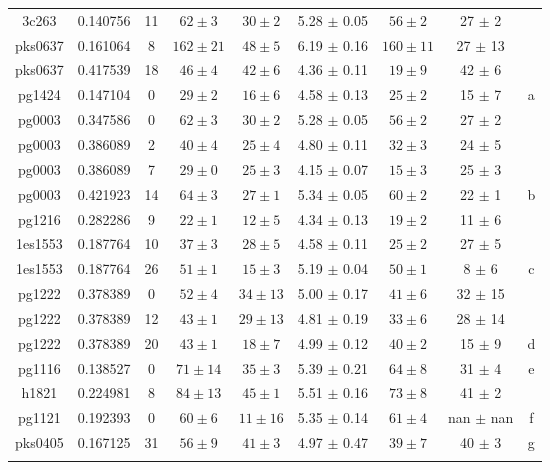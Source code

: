 \documentclass[12pt]{report}
\begin{document}
\begin{table}[!h]
\begin{tabular}{c@{\hspace{1.5em}}c@{\hspace{1.5em}}c@{\hspace{1.5em}}c@{\hspace{1.5em}}c@{\hspace{1.5em}}c@{\hspace{1em}}c@{\hspace{1em}}cc}
    3c263 & 0.140756 & 11  & $62 \pm 3$ & $30 \pm 2$ & 5.28 $\pm$ 0.05 & $56 \pm 2$ & 27 $\pm$ 2 &      \\
    pks0637 & 0.161064 & 8  & $162 \pm 21$ & $48 \pm 5$ & 6.19 $\pm$ 0.16 & $160 \pm 11$ & 27 $\pm$ 13 &      \\
    pks0637 & 0.417539 & 18  & $46 \pm 4$ & $42 \pm 6$ & 4.36 $\pm$ 0.11 & $19 \pm 9$ & 42 $\pm$ 6 &      \\
    pg1424 & 0.147104 & 0 & $29 \pm 2$ & $16 \pm 6$ & 4.58 $\pm$ 0.13 & $25 \pm 2$ & 15 $\pm$ 7 &   a   \\
    pg0003 & 0.347586 & 0 & $62 \pm 3$ & $30 \pm 2$ & 5.28 $\pm$ 0.05 & $56 \pm 2$ & 27 $\pm$ 2 &      \\
    pg0003 & 0.386089 & 2  & $40 \pm 4$ & $25 \pm 4$ & 4.80 $\pm$ 0.11 & $32 \pm 3$ & 24 $\pm$ 5 &      \\
    pg0003 & 0.386089 & 7  & $29 \pm 0$ & $25 \pm 3$ & 4.15 $\pm$ 0.07 & $15 \pm 3$ & 25 $\pm$ 3 &      \\
    pg0003 & 0.421923 & 14  & $64 \pm 3$ & $27 \pm 1$ & 5.34 $\pm$ 0.05 & $60 \pm 2$ & 22 $\pm$ 1 &   b   \\
    pg1216 & 0.282286 & 9  & $22 \pm 1$ & $12 \pm 5$ & 4.34 $\pm$ 0.13 & $19 \pm 2$ & 11 $\pm$ 6 &      \\
    1es1553 & 0.187764 & 10  & $37 \pm 3$ & $28 \pm 5$ & 4.58 $\pm$ 0.11 & $25 \pm 2$ & 27 $\pm$ 5 &      \\
    1es1553 & 0.187764 & 26  & $51 \pm 1$ & $15 \pm 3$ & 5.19 $\pm$ 0.04 & $50 \pm 1$ & 8 $\pm$ 6 &   c   \\
    pg1222 & 0.378389 & 0 & $52 \pm 4$ & $34 \pm 13$ & 5.00 $\pm$ 0.17 & $41 \pm 6$ & 32 $\pm$ 15 &      \\
    pg1222 & 0.378389 & 12  & $43 \pm 1$ & $29 \pm 13$ & 4.81 $\pm$ 0.19 & $33 \pm 6$ & 28 $\pm$ 14 &      \\
    pg1222 & 0.378389 & 20  & $43 \pm 1$ & $18 \pm 7$ & 4.99 $\pm$ 0.12 & $40 \pm 2$ & 15 $\pm$ 9 &   d   \\
    pg1116 & 0.138527 & 0 & $71 \pm 14$ & $35 \pm 3$ & 5.39 $\pm$ 0.21 & $64 \pm 8$ & 31 $\pm$ 4 &    e  \\
    h1821 & 0.224981 & 8  & $84 \pm 13$ & $45 \pm 1$ & 5.51 $\pm$ 0.16 & $73 \pm 8$ & 41 $\pm$ 2 &      \\
    pg1121 & 0.192393 & 0 & $60 \pm 6$ & $11 \pm 16$ & 5.35 $\pm$ 0.14 & $61 \pm 4$ & nan $\pm$ nan &  f    \\
    pks0405 & 0.167125 & 31  & $56 \pm 9$ & $41 \pm 3$ & 4.97 $\pm$ 0.47 & $39 \pm 7$ & 40 $\pm$ 3 &   g   \\

    \tabularnewline
    \hline 
    \end{tabular}
    \end{table}
  
\end{document}
